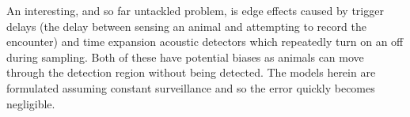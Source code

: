\documentclass[a4paper,10pt,reqno,oneside]{amsart}
\begin{document}
An interesting, and so far untackled problem, is edge effects caused by trigger delays (the delay between sensing an animal and attempting to record the encounter) and time expansion acoustic detectors which repeatedly turn on an off during sampling. Both of these have potential biases as animals can move through the detection region without being detected. The models herein are formulated assuming constant surveillance and so the error quickly becomes negligible.

	
	
\end{document}
